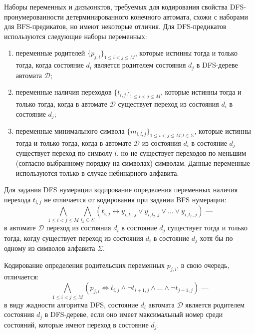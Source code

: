 Наборы переменных и дизъюнктов, требуемых для кодирования свойства DFS-пронумерованности детерминированного конечного автомата, схожи с наборами для BFS-предикатов, но имеют некоторые отличия.
Для DFS-предикатов используются следующие наборы переменных:
\begin{enumerate}
  \item переменные родителей $\{p_{j,i}\}_{1 \leq i < j \leq M}$, которые истинны тогда и только тогда, когда состояние $d_i$ является родителем состояния $d_j$ в DFS-дереве автомата $\mathcal{D}$;
  \item переменные наличия переходов $\{t_{i,j}\}_{1 \leq i < j \leq M}$, которые истинны тогда и только тогда, когда в автомате $\mathcal{D}$ существует переход из состояния $d_{i}$ в состояние $d_{j}$;
  \item переменные минимального символа $\{m_{i,l,j}\}_{1 \leq i < j \leq M;l \in \Sigma}$, которые истинны тогда и только тогда, когда в автомате $\mathcal{D}$ из состояния $d_{i}$ в состояние $d_{j}$ существует переход по символу $l$, но не существует переходов по меньшим (согласно выбранному порядку на символах) символам.
  Данные переменные используются только в случае небинарного алфавита.
\end{enumerate}

Для задания DFS нумерации кодирование определения переменных наличия перехода $t_{i,j}$ не отличается от кодирования при задании BFS нумерации:
\begin{equation*}
  \bigwedge_{1 \leq i < j \leq M} \bigwedge_{l_{k} \in \Sigma} \left(t_{i,j} \leftrightarrow y_{i,l_{1},j} \vee y_{i,l_{2},j} \vee \ldots \vee y_{i,l_{L},j} \right)\text{~---}
\end{equation*}
в автомате $\mathcal{D}$ переход из состояния $d_{i}$ в состояние $d_{j}$ существует тогда и только тогда, когду существует переход из состояния $d_{i}$ в состояние $d_{j}$ хотя бы по одному из символов алфавита $\Sigma$.

Кодирование определения родительских переменных $p_{j,i}$, в свою очередь, отличается:
\begin{equation*}
  \bigwedge\limits_{1 \leq i < j \leq M} \left(p_{j,i} \Leftrightarrow t_{i,j} \wedge \neg t_{i+1,j} \wedge \ldots \wedge \neg t_{j-1,j}\right)\text{~---}
\end{equation*}
в виду жадности алгоритма DFS, состояние $d_{i}$ автомата $\mathcal{D}$ является родителем состояния $d_{j}$ в DFS-дереве, если оно имеет максимальный номер среди состояний, которые имеют переход в состояние $d_{j}$.


